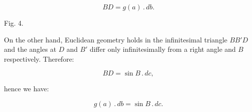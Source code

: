 \[
BD = g(a)\,.\,db.
\]

\begin{center}\begin{minipage}{\linewidth}\centering


Fig. 4.
\end{minipage}\end{center}

\noindent On the other hand, Euclidean geometry holds in the infinitesimal triangle $BB'D$ and the angles at $D$ and $B'$ differ only infinitesimally from a right angle and $B$ respectively. Therefore:

\[
BD = \sin B\,.\,dc,
\]

\noindent hence we have:

\[
\tag*{1)} g(a)\,.\,db = \sin B\,.\,dc.
\]

